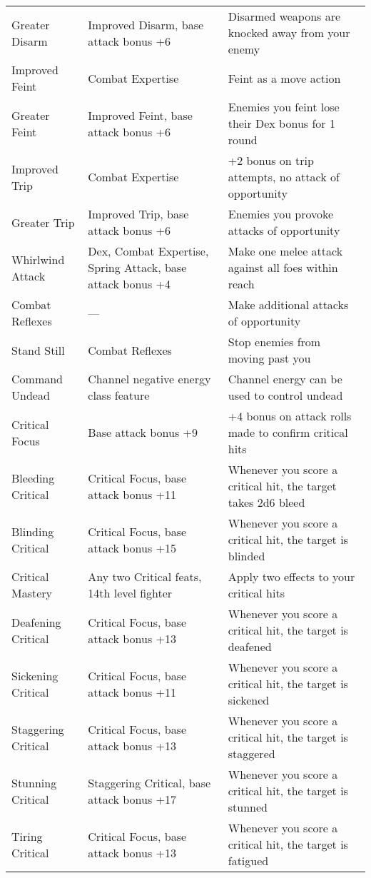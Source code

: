\begin{table*}[]
\begin{tabularx}{\linewidth}{lXl}
\quad \quad Greater Disarm & Improved Disarm, base attack bonus +6 & Disarmed weapons are knocked away from your enemy\\
\quad Improved Feint & Combat Expertise & Feint as a move action\\
\quad \quad Greater Feint & Improved Feint, base attack bonus +6 & Enemies you feint lose their Dex bonus for 1 round \\
\quad Improved Trip & Combat Expertise & +2 bonus on trip attempts, no attack of opportunity\\
\quad \quad Greater Trip & Improved Trip, base attack bonus +6 & Enemies you provoke attacks of opportunity\\
\quad Whirlwind Attack & Dex, Combat Expertise, Spring Attack, base attack bonus +4 & Make one melee attack against all foes within reach\\
Combat Reflexes & --- & Make additional attacks of opportunity\\
\quad Stand Still & Combat Reflexes & Stop enemies from moving past you\\
Command Undead & Channel negative energy class feature & Channel energy can be used to control undead\\
Critical Focus & Base attack bonus +9 & +4 bonus on attack rolls made to confirm critical hits\\
\quad Bleeding Critical & Critical Focus, base attack bonus +11 & Whenever you score a critical hit, the target takes 2d6 bleed \\
\quad Blinding Critical & Critical Focus, base attack bonus +15 & Whenever you score a critical hit, the target is blinded\\
\quad Critical Mastery & Any two Critical feats, 14th level fighter  & Apply two effects to your critical hits\\
\quad Deafening Critical & Critical Focus, base attack bonus +13 & Whenever you score a critical hit, the target is deafened\\
\quad Sickening Critical & Critical Focus, base attack bonus +11 & Whenever you score a critical hit, the target is sickened\\
\quad Staggering Critical & Critical Focus, base attack bonus +13 & Whenever you score a critical hit, the target is staggered\\
\quad Stunning Critical & Staggering Critical, base attack bonus +17 & Whenever you score a critical hit, the target is stunned\\
\quad Tiring Critical & Critical Focus, base attack bonus +13 & Whenever you score a critical hit, the target is fatigued\\

\end{tabularx}
\end{table*}
